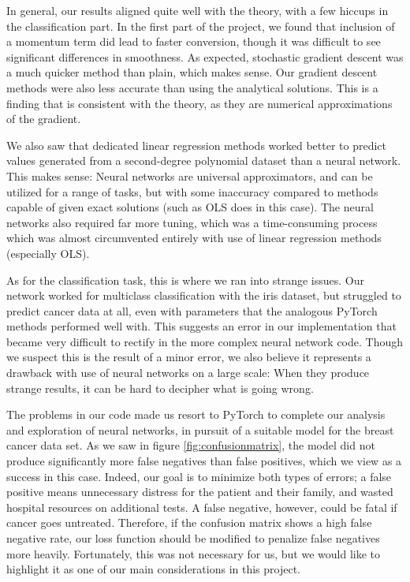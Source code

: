 In general, our results aligned quite well with the theory, with a few hiccups in the classification part. In the first part of the project, we found that inclusion of a momentum term did lead to faster conversion, though it was difficult to see significant differences in smoothness. As expected, stochastic gradient descent was a much quicker method than plain, which makes sense. Our gradient descent methods were also less accurate than using the analytical solutions. This is a finding that is consistent with the theory, as they are numerical approximations of the gradient. 

We also saw that dedicated linear regression methods worked better to predict values generated from a second-degree polynomial dataset than a neural network. This makes sense: Neural networks are universal approximators, and can be utilized for a range of tasks, but with some inaccuracy compared to methods capable of given exact solutions (such as OLS does in this case). The neural networks also required far more tuning, which was a time-consuming process which was almost circumvented entirely with use of linear regression methods (especially OLS).

As for the classification task, this is where we ran into strange issues. Our network worked for multiclass classification with the iris dataset, but struggled to predict cancer data at all, even with parameters that the analogous PyTorch methods performed well with. This suggests an error in our implementation that became very difficult to rectify in the more complex neural network code. Though we suspect this is the result of a minor error, we also believe it represents a drawback with use of neural networks on a large scale: When they produce strange results, it can be hard to decipher what is going wrong. 

The problems in our code made us resort to PyTorch to complete our analysis and exploration of neural networks, in pursuit of a suitable model for the breast cancer data set. As we saw in figure \ref{fig:confusionmatrix}, the model did not produce significantly more false negatives than false positives, which we view as a success in this case. Indeed, our goal is to minimize both types of errors; a false positive means unnecessary distress for the patient and their family, and wasted hospital resources on additional tests. A false negative, however, could be fatal if cancer goes untreated. Therefore, if the confusion matrix shows a high false negative rate, our loss function should be modified to penalize false negatives more heavily. Fortunately, this was not necessary for us, but we would like to highlight it as one of our main considerations in this project. 

